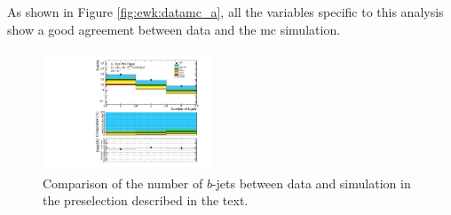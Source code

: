 As shown in Figure \ref{fig:ewk:datamc_a}, all the variables specific to this analysis show a good 
agreement between data and the \gls{mc} simulation. 

\begin{figure}[htbp]
\centering 
\includegraphics[width=0.45\textwidth]{figures/ewk_prod/data_mc/0L_3bin/data_mc_bjets_n.pdf}
\caption{Comparison of the number of $b$-jets between data and simulation in the preselection described in the text.
}
\label{fig:ewk:datamc_bjets}
\end{figure}

